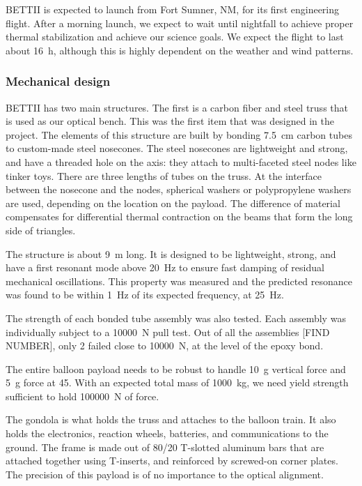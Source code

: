 BETTII is expected to launch from Fort Sumner, NM, for its first engineering flight. After a morning launch, we expect to wait until nightfall to achieve proper thermal stabilization and achieve our science goals. We expect the flight to last about \SI{16}{\hour}, although this is highly dependent on the weather and wind patterns.


\subsubsection{Mechanical design}

BETTII has two main structures. The first is a carbon fiber and steel truss that is used as our optical bench. This was the first item that was designed in the project. The elements of this structure are built by bonding \SI{7.5}{\centi\meter} carbon tubes to custom-made steel nosecones. The steel nosecones are lightweight and strong, and have a threaded hole on the axis: they attach to multi-faceted steel nodes like tinker toys. There are three lengths of tubes on the truss. At the interface between the nosecone and the nodes, spherical washers or polypropylene washers are used, depending on the location on the payload. The difference of material compensates for differential thermal contraction on the beams that form the long side of triangles.

The structure is about \SI{9}{\meter} long. It is designed to be lightweight, strong, and have a first resonant mode above \SI{20}{\hertz} to ensure fast damping of residual mechanical oscillations. This property was measured and the predicted resonance was found to be within \SI{1}{\hertz} of its expected frequency, at \SI{25}{\hertz}.

The strength of each bonded tube assembly was also tested. Each assembly was individually subject to a \SI{10000}{\newton} pull test. Out of all the assemblies [FIND NUMBER], only 2 failed close to \SI{10000}{\newton}, at the level of the epoxy bond. 

The entire balloon payload needs to be robust to handle 10~g vertical force and 5~g force at \SI{45}{\deg}. With an expected total mass of \SI{1000}{\kilo\gram}, we need yield strength sufficient to hold \SI{100000}{\newton} of force. 

The gondola is what holds the truss and attaches to the balloon train. It also holds the electronics, reaction wheels, batteries, and communications to the ground. The frame is made out of 80/20 T-slotted aluminum bars that are attached together using T-inserts, and reinforced by screwed-on corner plates. The precision of this payload is of no importance to the optical alignment. 


